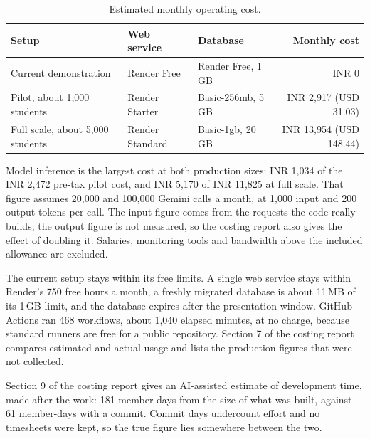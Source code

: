 \begin{table}[h]
\centering\small
\caption{Estimated monthly operating cost.}
\label{tab:cost}
\begin{tabular}{@{}lllr@{}}
\toprule
Setup & Web service & Database & Monthly cost \\
\midrule
Current demonstration & Render Free & Render Free, 1\,GB & INR 0 \\
Pilot, about 1,000 students & Render Starter & Basic-256mb, 5\,GB & INR 2,917 (USD 31.03) \\
Full scale, about 5,000 students & Render Standard & Basic-1gb, 20\,GB & INR 13,954 (USD 148.44) \\
\bottomrule
\end{tabular}
\end{table}

Model inference is the largest cost at both production sizes: INR 1,034 of the INR 2,472 pre-tax pilot cost,
and INR 5,170 of INR 11,825 at full scale. That figure assumes 20,000 and 100,000 Gemini calls a month, at
1,000 input and 200 output tokens per call. The input figure comes from the requests the code really builds;
the output figure is not measured, so the costing report also gives the effect of doubling it. Salaries,
monitoring tools and bandwidth above the included allowance are excluded.

The current setup stays within its free limits. A single web service stays within Render's 750 free hours a
month, a freshly migrated database is about 11\,MB of its 1\,GB limit, and the database expires after the
presentation window. GitHub Actions ran 468 workflows, about 1,040 elapsed minutes, at no charge, because
standard runners are free for a public repository. Section 7 of the costing report compares estimated and
actual usage and lists the production figures that were not collected.

Section 9 of the costing report gives an AI-assisted estimate of development time, made after the work: 181
member-days from the size of what was built, against 61 member-days with a commit. Commit days undercount
effort and no timesheets were kept, so the true figure lies somewhere between the two.
